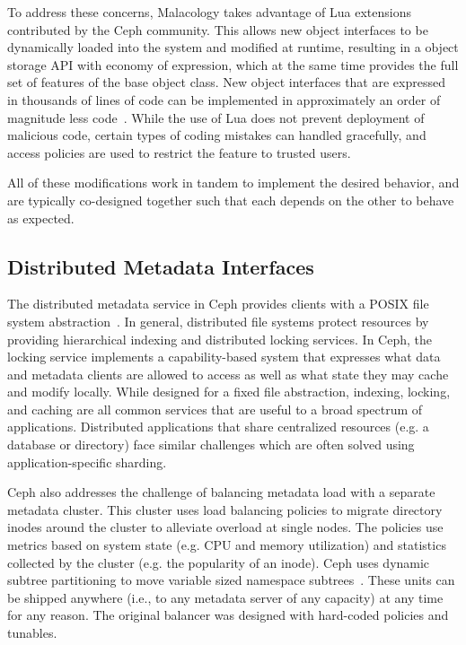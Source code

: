 \documentclass[preprint]{sigplanconf-eurosys}
\begin{document}
To address these concerns, Malacology takes advantage of Lua extensions
contributed by the Ceph community. This allows new object interfaces to be
dynamically loaded into the system and modified at runtime, resulting in a
object storage API with economy of expression, which at the same time provides
the full set of features of the base object class. New object interfaces that
are expressed in thousands of lines of code can be implemented in approximately
an order of magnitude less code~\cite{geambasu_comet_2010}. While the use of
Lua does not prevent deployment of malicious code, certain types of coding
mistakes can handled gracefully, and access policies are used to restrict the
feature to trusted users.

All of these modifications work in tandem to implement the desired behavior,
and are typically co-designed together such that each depends on the other to
behave as expected. 

\subsection{Distributed Metadata Interfaces}
\label{malacology:mds}

The distributed metadata service in Ceph provides clients with a POSIX file
system abstraction~\cite{weil:sc2004-dyn-metadata}. In general, distributed
file systems protect resources by providing hierarchical indexing and
distributed locking services.  In Ceph, the locking service implements a
capability-based system that expresses what data and metadata clients are
allowed to access as well as what state they may cache and modify locally.
While designed for a fixed file abstraction, indexing, locking, and caching are
all common services that are useful to a broad spectrum of applications.
Distributed applications that share centralized resources (e.g. a database or
directory) face similar challenges which are often solved using
application-specific sharding. 

Ceph also addresses the challenge of balancing metadata load with a separate
metadata cluster. This cluster uses load balancing policies to migrate
directory inodes around the cluster to alleviate overload at single nodes. The policies use metrics
based on system state (e.g.  CPU and memory utilization) and statistics
collected by the cluster (e.g. the popularity of an inode). Ceph uses dynamic
subtree partitioning to move variable sized namespace
subtrees~\cite{weil:sc2004-dyn-metadata}. These units can
be shipped anywhere (i.e., to any metadata server of any capacity) at any time
for any reason. The original balancer was designed with hard-coded policies and
tunables.
\end{document}
